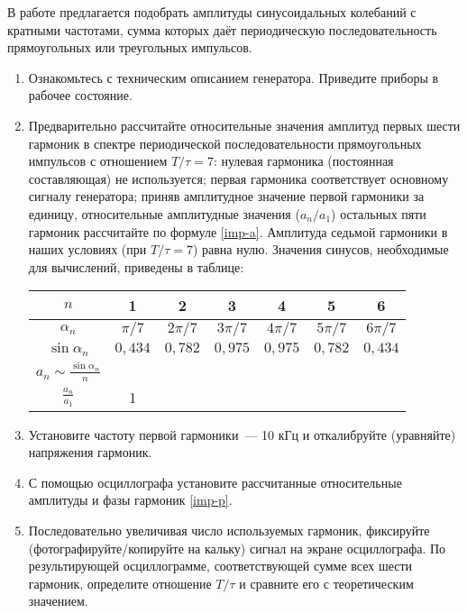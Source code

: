 \begin{lab:task}

В работе предлагается подобрать амплитуды синусоидальных колебаний с кратными
частотами, сумма которых даёт периодическую последовательность прямоугольных или
треугольных импульсов.


\begin{enumerate}
	\item Ознакомьтесь с техническим описанием генератора. Приведите
приборы в рабочее состояние.

\item Предварительно рассчитайте относительные значения амплитуд первых шести
гармоник в спектре периодической последовательности прямоугольных импульсов с
отношением $T/\tau=7$: нулевая гармоника (постоянная составляющая) не
используется; первая гармоника соответствует основному сигналу генератора;
приняв амплитудное значение первой гармоники за единицу, относительные
амплитудные значения ($a_n/a_1$) остальных пяти гармоник рассчитайте по формуле
\eqref{imp-a}. Амплитуда седьмой гармоники в наших условиях (при
$T/\tau=7$) равна нулю. Значения синусов, необходимые для вычислений, приведены
в таблице:
\begin{center}
\begin{tabular}{|c|c|c|c|c|c|c|} \hline
$n$ & 1 & 2 & 3 & 4 & 5 & 6 \\ \hline $\alpha_n$&$\pi /7$&$2\pi /7$&$3\pi
/7$&$4\pi /7$&$5\pi /7$& $6\pi /7$ \\ \hline
$\sin \alpha_n$ & $0{,}434$ & $0{,}782$ & $0{,}975$ & $0{,}975$ &$0{,}782$ &
$0{,}434$ \\ \hline $a_n\sim\frac{\sin
\alpha_n}{n}$& & & & & & \\ \hline $\frac{a_n}{a_1}$&1& & & & & \\ \hline
\end{tabular}
\end{center}

	\item Установите частоту первой гармоники~--- 10 кГц и
откалибруйте (уравняйте) напряжения гармоник.
	\item С помощью осциллографа установите рассчитанные относительные амплитуды
и фазы гармоник \eqref{imp-p}.
	\item Последовательно увеличивая число используемых гармоник, фиксируйте
(фотографируйте/копируйте на кальку) сигнал на экране осциллографа. По
результирующей осциллограмме, соответствующей сумме всех шести гармоник,
определите отношение $T/\tau$ и сравните его с теоретическим значением.


\end{enumerate}
\end{lab:task}
